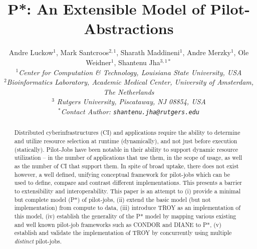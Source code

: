 \documentclass[conference,final]{IEEEtran}
\title{P*: An Extensible Model of Pilot-Abstractions}
\date{}
\newcommand{\up}{\vspace*{-1em}}
\newcommand{\upp}{\vspace*{-0.5em}}
\begin{document}
\ifpdf
{}
\else
{}
\fi

\author{
  Andre Luckow$^{1}$, Mark Santcroos$^{2,1}$, Sharath Maddineni$^{1}$, Andre Merzky$^{1}$, Ole Weidner$^{1}$, Shantenu Jha$^{3,1*}$\\
  \small{\emph{$^{1}$Center for Computation \& Technology, Louisiana State University, USA}}\\
 \small{\emph{$^{2}$Bioinformatics Laboratory, Academic Medical Center, University of Amsterdam, The Netherlands}}\\
 \small{\emph{$^{3}$ Rutgers University, Piscataway, NJ 08854, USA}}\\
  \small{\emph{$^{*}$Contact Author: \texttt{shantenu.jha@rutgers.edu}}}\\
  \up\up\up\up }

\maketitle

\begin{abstract}
  \up Distributed cyberinfrastructures (CI) and applications require
  the ability to determine and utilize resource selection at runtime
  (dynamically), and not just before execution (statically).
  Pilot-Jobs have been notable in their ability to support dynamic
  resource utilization -- in the number of applications that use them,
  in the scope of usage, as well as the number of CI that support
  them.  In spite of broad uptake, there does not exist however, a
  well defined, unifying conceptual framework for pilot-jobs which can
  be used to define, compare and contrast different
  implementations. This presents a barrier to extensibility and
  interoperability. This paper is an attempt to (i) provide a minimal
  but complete model (P*) of pilot-jobs, (ii) extend the basic model
  (but not implementation) from compute to data, (iii) introduce TROY
  as an implementation of this model, %
  (iv) establish the generality of the P* model by mapping various
  existing and well known pilot-job frameworks such as CONDOR and
  DIANE to P*, (v) establish and validate the implementation of TROY
  by concurrently using multiple {\it distinct} pilot-jobs. \upp\upp\upp\upp
\end{abstract}
\end{document}
